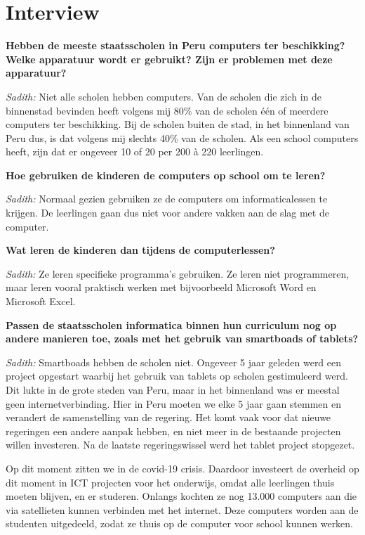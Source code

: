 \section{Interview}
\textbf{Hebben de meeste staatsscholen in Peru computers ter beschikking? Welke apparatuur wordt er gebruikt? Zijn er problemen met deze apparatuur?}

\textit{Sadith:} Niet alle scholen hebben computers. Van de scholen die zich in de binnenstad bevinden heeft volgens mij 80\% van de scholen één of meerdere computers ter beschikking. Bij de scholen buiten de stad, in het binnenland van Peru dus, is dat volgens mij slechts 40\% van de scholen. Als een school computers heeft, zijn dat er ongeveer 10 of 20 per 200 à 220 leerlingen.

\textbf{Hoe gebruiken de kinderen de computers op school om te leren?}

\textit{Sadith:} Normaal gezien gebruiken ze de computers om informaticalessen te krijgen. De leerlingen gaan dus niet voor andere vakken aan de slag met de computer. 

\textbf{Wat leren de kinderen dan tijdens de computerlessen?}

\textit{Sadith:} Ze leren specifieke programma's gebruiken. Ze leren niet programmeren, maar leren vooral praktisch werken met bijvoorbeeld Microsoft Word en Microsoft Excel.

\textbf{Passen de staatsscholen informatica binnen hun curriculum nog op andere manieren toe, zoals met het gebruik van smartboads of tablets?}

\textit{Sadith:} Smartboads hebben de scholen niet. Ongeveer 5 jaar geleden werd een project opgestart waarbij het gebruik van tablets op scholen gestimuleerd werd. Dit lukte in de grote steden van Peru, maar in het binnenland was er meestal geen internetverbinding. Hier in Peru moeten we elke 5 jaar gaan stemmen en verandert de samenstelling van de regering. Het komt vaak voor dat nieuwe regeringen een andere aanpak hebben, en niet meer in de bestaande projecten willen investeren. Na de laatste regeringswissel werd het tablet project stopgezet.

Op dit moment zitten we in de covid-19 crisis. Daardoor investeert de overheid op dit moment in ICT projecten voor het onderwijs, omdat alle leerlingen thuis moeten blijven, en er studeren. Onlangs kochten ze nog 13.000 computers aan die via satellieten kunnen verbinden met het internet. Deze computers worden aan de studenten uitgedeeld, zodat ze thuis op de computer voor school kunnen werken. 

